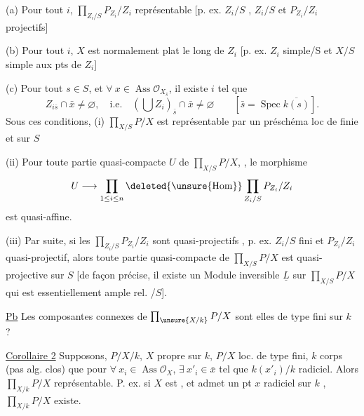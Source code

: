 (a) Pour tout $i$, $\displaystyle\prod_{Z_i/S}P_{Z_i}/Z_i$ représentable
[p. ex. $Z_i/S$ , 
$Z_i/S$ et $P_{Z_i}/Z_i$ projectifs]

(b) Pour tout $i$, $X$ est normalement plat le long de $Z_i$
[p. ex. $Z_i$ simple/S et $X/S$ simple aux pts de $Z_i$]

(c) Pour tout $s\in S$, et $\forall\ x\in\operatorname{Ass}\mathcal{O}_{X_{\bar s}}$, il existe $i$ tel que
\[
Z_{i\bar s}\cap\bar x\ne\varnothing,\quad\text{i.e.}\quad
(\bigcup Z_i)_{\bar s}\cap\bar x\ne\varnothing\qquad[\bar s=\operatorname{Spec}\overline{k(s)}].
\]
Sous ces conditions, (i) $\displaystyle\prod_{X/S}P/X$ est représentable
par un préschéma loc de   finie et  sur $S$

 (ii) Pour toute partie  quasi-compacte $U$ de
$\displaystyle\prod_{X/S}P/X$, ,
le morphisme
\[
U\longrightarrow\prod_{1\leq i\leq n}\deleted{\unsure{\operatorname{Hom}}}\prod_{Z_i/S}P_{Z_i}/Z_i
\]
est quasi-affine.

(iii) Par suite, si les
$\displaystyle\prod_{Z_i/S}P_{Z_i}/Z_i$ sont quasi-projectifs  ,
p. ex. $Z_i/S$ fini et $P_{Z_i}/Z_i$
quasi-projectif, alors toute partie quasi-compacte de
$\displaystyle\prod_{X/S}P/X$ est quasi-projective sur $S$ [de façon précise, il
existe un Module inversible $\underline L$ sur $\displaystyle\prod_{X/S}P/X$ qui est
essentiellement ample rel. /$S$].

\uline{Pb} Les composantes connexes de $\prod_{\unsure{X/k}}P/X$ sont elles de type fini sur $k$ ?

\uline{Corollaire 2} Supposons,    $P/X/k$, $X$ propre sur $k$, $P/X$ loc. de type fini, $k$ corps (pas   alg. clos) que \deleted{$\forall$} pour $\forall\ x_i\in\operatorname{Ass}\mathcal O_X$, $\exists\ x'_i\in\bar x$ tel que $k(x'_i)/k$ radiciel.  Alors $\prod_{X/k}P/X$ représentable.
P. ex. si $X$  est  , et admet un pt $x$ radiciel sur $k$ , $\prod_{X/k}P/X$ existe.


